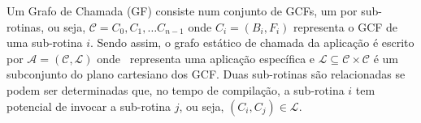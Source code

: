       \label{sec:gc}
         Um Grafo de Chamada (GF) consiste num conjunto de GCFs, um por sub-rotinas, ou seja, $\mathcal{C} = {C_0, C_1, \dots C_{n-1}}$
         onde $ C_i = (B_i, F_i) $ representa o GCF de uma sub-rotina $ i $. %
         Sendo assim, o grafo estático de chamada da aplicação é escrito por $\mathcal{A} = (\mathcal{C}, \mathcal{L}) \label{eq:a}$
         onde \A\ representa uma aplicação específica e $ \mathcal{L} \subseteq \mathcal{C} \times \mathcal{C} $ é um subconjunto do plano cartesiano dos GCF.
         Duas sub-rotinas são relacionadas se podem ser determinadas que, no tempo de compilação, a sub-rotina $ i $ tem potencial de invocar a sub-rotina $ j $, ou seja, $ (C_i, C_j) \in \mathcal{L} $.


